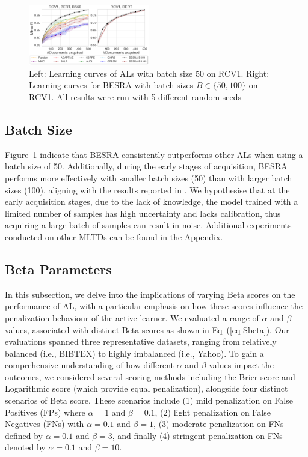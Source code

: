 \documentclass[letterpaper]{article} %
\begin{document}
\begin{figure}[!ht]
\centering
\includegraphics[width=0.47\textwidth]{figures/batchsize_mircof1_2_v1.png}
    \caption{
    Left: Learning curves of ALs with batch size 50 on RCV1. Right: Learning curves for BESRA with batch sizes $B \in  \{50, 100\}$ on RCV1. All results were run with 5 different random seeds}
    \label{fig:batchsize_mircof1_2}
\end{figure}

\subsection{Batch Size}
Figure~\ref{fig:batchsize_mircof1_2} indicate that BESRA consistently outperforms other ALs when using a batch size of 50.
Additionally, during the early stages of acquisition, BESRA performs more effectively with smaller batch sizes (50) than with larger batch sizes (100), aligning with the results reported in \cite{TanDuBun-IEEEPAMI23, NEURIPS2019_95323660}.
We hypothesise that at the early acquisition stages, due to the lack of knowledge, the model trained with a limited number of samples has high uncertainty and lacks calibration, thus acquiring a large batch of samples can result in noise. Additional experiments conducted on other MLTDs can be found in the Appendix.


\subsection{Beta Parameters}

In this subsection, we delve into the implications of varying Beta scores on the performance of AL, with a particular emphasis on how these scores influence the penalization behaviour of the active learner.
We evaluated a range of $\alpha$ and $\beta$ values, associated with distinct Beta scores as shown in Eq~(\ref{eq-Sbeta}).
Our evaluations spanned three representative datasets, ranging from relatively balanced (i.e., BIBTEX) to highly imbalanced (i.e., Yahoo). To gain a comprehensive understanding of how different $\alpha$ and $\beta$ values impact the outcomes, we considered several scoring methods including the Brier score and Logarithmic score (which provide equal penalization), alongside four distinct scenarios of Beta score. These scenarios include (1) mild penalization on False Positives (FPs) where $\alpha=1$ and $\beta=0.1$, (2) light penalization on False Negatives (FNs) with $\alpha=0.1$ and $\beta=1$, (3) moderate penalization on FNs defined by $\alpha=0.1$ and $\beta=3$, and finally (4) stringent penalization on FNs denoted by $\alpha=0.1$ and $\beta=10$.
\end{document}
